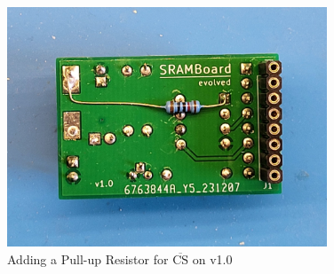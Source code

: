 \documentclass{article}
\newcommand{\CS}{$\overline{\mbox{CS}}$}
\begin{document}
\begin{figure}[htb]
\centering
\includegraphics[width=0.85\textwidth]{Pictures/CSPullupV10.jpg}
\caption{Adding a Pull-up Resistor for \CS{} on v1.0}
\label{fig:csPullupV10}
\end{figure}
\end{document}
